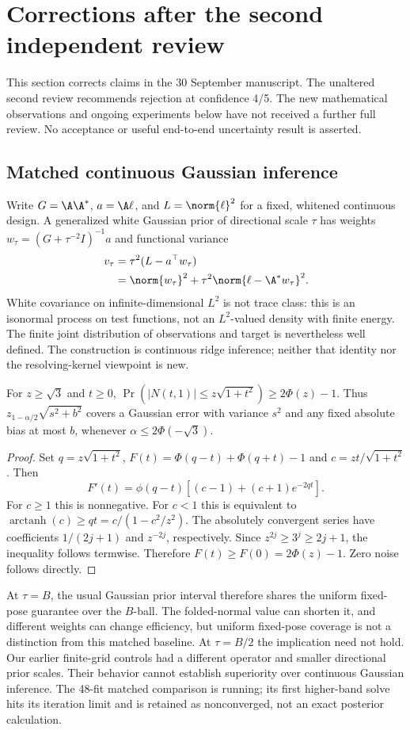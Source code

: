 \section{Corrections after the second independent review}\label{sec:reviewtwocorrections}
This section corrects claims in the 30 September manuscript. The unaltered
second review recommends rejection at confidence 4/5. The new mathematical
observations and ongoing experiments below have not received a further full
review. No acceptance or useful end-to-end uncertainty result is asserted.

\subsection{Matched continuous Gaussian inference}
Write $G=\A\A^*$, $a=\A\ell$, and $L=\norm{\ell}^2$ for a fixed, whitened
continuous design. A generalized white Gaussian prior of directional scale
$\tau$ has weights $w_\tau=(G+\tau^{-2}I)^{-1}a$ and functional variance
\begin{align}
v_\tau&=\tau^2(L-a^\top w_\tau)\nonumber\\
&=\norm{w_\tau}^2+\tau^2\norm{\ell-\A^*w_\tau}^2.
\end{align}
White covariance on infinite-dimensional $L^2$ is not trace class: this is an
isonormal process on test functions, not an $L^2$-valued density with finite
energy. The finite joint distribution of observations and target is nevertheless
well defined. The construction is continuous ridge inference; neither that
identity nor the resolving-kernel viewpoint is new.

\begin{proposition}
For $z\ge\sqrt{3}$ and $t\ge0$,
$\Pr(|N(t,1)|\le z\sqrt{1+t^2})\ge2\Phi(z)-1$.
Thus $z_{1-\alpha/2}\sqrt{s^2+b^2}$ covers a Gaussian error with variance
$s^2$ and any fixed absolute bias at most $b$, whenever
$\alpha\le2\Phi(-\sqrt{3})$.
\end{proposition}
\begin{proof}
Set $q=z\sqrt{1+t^2}$, $F(t)=\Phi(q-t)+\Phi(q+t)-1$ and
$c=zt/\sqrt{1+t^2}$. Then
\[
F'(t)=\phi(q-t)[(c-1)+(c+1)e^{-2qt}].
\]
For $c\ge1$ this is nonnegative. For $c<1$ this is equivalent to
$\operatorname{arctanh}(c)\ge qt=c/(1-c^2/z^2)$. The absolutely convergent
series have coefficients $1/(2j+1)$ and $z^{-2j}$, respectively.
Since $z^{2j}\ge3^j\ge2j+1$, the inequality follows termwise.
Therefore $F(t)\ge F(0)=2\Phi(z)-1$. Zero noise follows directly.
\end{proof}
At $\tau=B$, the usual Gaussian prior interval therefore shares the uniform
fixed-pose guarantee over the $B$-ball. The folded-normal value can shorten it,
and different weights can change efficiency, but uniform fixed-pose coverage
is not a distinction from this matched baseline. At $\tau=B/2$ the implication
need not hold. Our earlier finite-grid controls had a different operator and
smaller directional prior scales. Their behavior cannot establish superiority
over continuous Gaussian inference. The 48-fit matched comparison is running;
its first higher-band solve hits its iteration limit and is retained as
nonconverged, not an exact posterior calculation.

